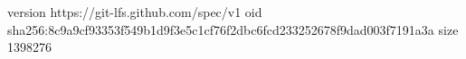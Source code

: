 version https://git-lfs.github.com/spec/v1
oid sha256:8c9a9cf93353f549b1d9f3e5c1cf76f2dbc6fcd233252678f9dad003f7191a3a
size 1398276
